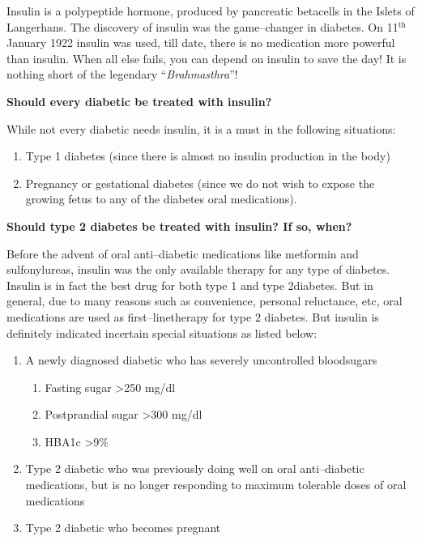 Insulin is a polypeptide hormone, produced by pancreatic beta\break cells in the Islets of Langerhans. The discovery of insulin was the game–changer in diabetes. On 11$^{\text{th}}$ January 1922 insulin was used, till date, there is no medication more powerful than insulin. When all else fails, you can depend on insulin to save the day! It is nothing short of the legendary “\textit{Brahmasthra}”!

\noindent\textbf{Should every diabetic be treated with insulin?}

While not every diabetic needs insulin, it is a must in the following situations:

\vspace{-\topsep}
\begin{enumerate}[•]
\itemsep=0pt
\item Type 1 diabetes (since there is almost no insulin production in the body)
\item Pregnancy or gestational diabetes (since we do not wish to expose the growing fetus to any of the diabetes oral medications).
\end{enumerate}
\vspace{-\topsep}

\noindent\textbf{Should type 2 diabetes be treated with insulin? If so, when?}

Before the advent of oral anti–diabetic medications like metformin and sulfonylureas, insulin was the only available therapy for any type of diabetes. Insulin is in fact the best drug for both type 1 and type 2\break diabetes. But in general, due to many reasons such as convenience, personal reluctance, etc, oral medications are used as first–line\break therapy for type 2 diabetes. But insulin is definitely indicated in\break certain special situations as listed below:

\begin{enumerate}[•]
\itemsep=0pt
\item A newly diagnosed diabetic who has severely uncontrolled blood\break sugars
\vspace{-\topsep}
\begin{enumerate}[•]
\itemsep=0pt
\item Fasting sugar \textgreater  250 mg/dl
\item Postprandial sugar \textgreater  300 mg/dl
\item HBA1c \textgreater 9\%
\end{enumerate}
\item Type 2 diabetic who was previously doing well on oral anti–diabetic medications, but is no longer responding to maximum tolerable doses of oral medications
\item Type 2 diabetic who becomes pregnant
\end{enumerate}
\vspace{-\topsep}

